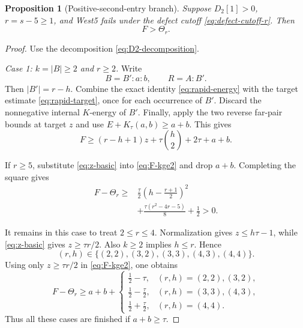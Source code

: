 \documentclass[11pt]{article}
\newtheorem{proposition}[theorem]{Proposition}
\theoremstyle{definition}
\theoremstyle{remark}
\begin{document}
\begin{proposition}[Positive-second-entry branch]
\label{prop:positive}
Suppose $D_2[1]>0$, $r=s-5\ge1$, and West5 fails under the defect cutoff
\eqref{eq:defect-cutoff-r}.  Then
\begin{equation}
 F>\Theta_r.
 \label{eq:F-positive}
\end{equation}
\end{proposition}

\begin{proof}
Use the decomposition \eqref{eq:D2-decomposition}.

\medskip
\noindent\emph{Case 1: $k=|B|\ge2$ and $r\ge2$.}
Write
\[
 B=B':a:b,
 \qquad
 R=A:B'.
\]
Then $|B'|=r-h$.  Combine the exact identity
\eqref{eq:rapid-energy} with the target estimate
\eqref{eq:rapid-target}, once for each occurrence of $B'$.  Discard the
nonnegative internal $K$-energy of $B'$.  Finally, apply the two reverse
far-pair bounds at target $z$ and use
$E+K_\tau(a,b)\ge a+b$.  This gives
\begin{equation}
 F\ge(r-h+1)z+\tau\binom h2+2\tau+a+b.
 \label{eq:F-kge2}
\end{equation}

If $r\ge5$, substitute \eqref{eq:z-basic} into
\eqref{eq:F-kge2} and drop $a+b$.  Completing the square gives
\begin{equation}
\begin{aligned}
 F-\Theta_r
 \ge{}&\frac{\tau}{2}
 \left(h-\frac{r+1}{2}\right)^2\\
 &+\frac{\tau(r^2-4r-5)}8+\frac12>0.
\end{aligned}
\label{eq:large-r-square}
\end{equation}

It remains in this case to treat $2\le r\le4$.  Normalization gives
$z\le h\tau-1$, while \eqref{eq:z-basic} gives
$z\ge\tau r/2$.  Also $k\ge2$ implies $h\le r$.  Hence
\[
 (r,h)\in
 \{(2,2),(3,2),(3,3),(4,3),(4,4)\}.
\]
Using only $z\ge\tau r/2$ in \eqref{eq:F-kge2}, one obtains
\begin{equation}
 F-\Theta_r\ge a+b+
 \begin{cases}
  \frac12-\tau,&(r,h)=(2,2),(3,2),\\[1mm]
  \frac12-\frac\tau2,&(r,h)=(3,3),(4,3),\\[1mm]
  \frac12+\frac\tau2,&(r,h)=(4,4).
 \end{cases}
 \label{eq:small-r-table}
\end{equation}
Thus all these cases are finished if $a+b\ge\tau$.


\end{proof}
\end{document}

